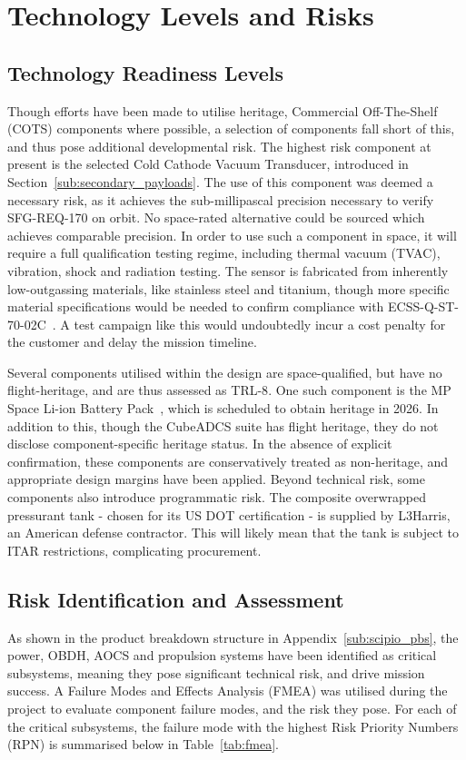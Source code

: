 \documentclass[a4paper, 11pt, conference]{IEEEtran}
\begin{document}
\section{Technology Levels and Risks}
\label{sub:risks}
\subsection{Technology Readiness Levels}


Though efforts have been made to utilise heritage, Commercial Off-The-Shelf (COTS) components where possible, a selection of components fall short of this, and thus pose additional developmental risk. The highest risk component at present is the selected Cold Cathode Vacuum Transducer, introduced in Section~\ref{sub:secondary_payloads}. The use of this component was deemed a necessary risk, as it achieves the sub-millipascal precision necessary to verify SFG-REQ-170 on orbit. No space-rated alternative could be sourced which achieves comparable precision. In order to use such a component in space, it will require a full qualification testing regime, including thermal vacuum (TVAC\label{nom:tvac}), vibration, shock and radiation testing. The sensor is fabricated from inherently low-outgassing materials, like stainless steel and titanium, though more specific material specifications would be needed to confirm compliance with ECSS-Q-ST-70-02C~\cite{ECSS-Q-ST-70-02C_2008}. A test campaign like this would undoubtedly incur a cost penalty for the customer and delay the mission timeline. 

Several components utilised within the design are space-qualified, but have no flight-heritage, and are thus assessed as TRL-8\label{nom:trl}. One such component is the MP Space Li-ion Battery Pack~\cite{MPSpacePack2_2024}, which is scheduled to obtain heritage in 2026. In addition to this, though the CubeADCS suite has flight heritage, they do not disclose component-specific heritage status. In the absence of explicit confirmation, these components are conservatively treated as non-heritage, and appropriate design margins have been applied. Beyond technical risk, some components also introduce programmatic risk. The composite overwrapped pressurant tank - chosen for its US DOT certification - is supplied by L3Harris, an American defense contractor. This will likely mean that the tank is subject to ITAR restrictions, complicating procurement.

\subsection{Risk Identification and Assessment}
As shown in the product breakdown structure in Appendix~\ref{sub:scipio_pbs}, the power, OBDH, AOCS and propulsion systems have been identified as critical subsystems, meaning they pose significant technical risk, and drive mission success. A Failure Modes and Effects Analysis (FMEA\label{nom:fmea}) was utilised during the project to evaluate component failure modes, and the risk they pose. For each of the critical subsystems, the failure mode with the highest Risk Priority Numbers (RPN\label{nom:rpn}) is summarised below in Table~\ref{tab:fmea}.
\end{document}
